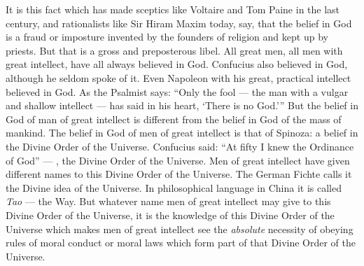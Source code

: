 It is this fact which has made sceptics like Voltaire  and Tom Paine  in the last century, and rationalists like Sir Hiram Maxim  today, say, that the belief in God is a fraud or imposture invented by the founders of religion and kept up by priests.
But that is a gross and preposterous libel.
All great men, all men with great intellect, have all always believed in God.
Confucius also believed in God, although he seldom spoke of it.
Even Napoleon with his great, practical intellect believed in God.
As the Psalmist  says: ``Only the fool --- the man with a vulgar and shallow intellect --- has said in his heart, `There is no God.'\thinspace''
But the belief in God of man of great intellect is different from the belief in God of the mass of mankind.
The belief in God of men of great intellect is that of Spinoza: a belief in the Divine Order of the Universe.
Confucius said: ``At fifty I knew the Ordinance of God''\cite{num16} --- \ie, the Divine Order of the Universe.
Men of great intellect have given different names to this Divine Order of the Universe.
The German Fichte  calls it the Divine idea of the Universe.
In philosophical language in China it is called \emph{Tao} --- the Way.
But whatever name men of great intellect may give to this Divine Order of the Universe, it is the knowledge of this Divine Order of the Universe which makes men of great intellect see the \emph{absolute} necessity of obeying rules of moral conduct or moral laws which form part of that Divine Order of the Universe.

